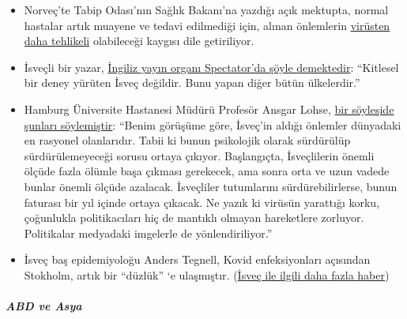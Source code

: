 \begin{itemize}
\tightlist
\item
  Norveç'te Tabip Odası'nın Sağlık Bakanı'na yazdığı açık mektupta,
  normal hastalar artık muayene ve tedavi edilmediği için, alınan
  önlemlerin
  \href{https://www.abcnyheter.no/helse-og-livsstil/helse/2020/04/06/195667780/nesten-halvparten-av-sengene-pa-oslo-universitetssykehus-star-tomme}{virüsten
  daha tehlikeli} olabileceği kaygısı dile getiriliyor.
\item
  İsveçli bir yazar,
  \href{https://www.spectator.co.uk/article/no-lockdown-please-w-re-swedish}{İngiliz
  yayın organı Spectator'da şöyle demektedir}: ``Kitlesel bir deney
  yürüten İsveç değildir. Bunu yapan diğer bütün ülkelerdir.''
\item
  Hamburg Üniversite Hastanesi Müdürü Profesör Ansgar Lohse,
  \href{https://www.abendblatt.de/hamburg/article228880917/uke-professor-shutdown-lohse-deutschland-hamburg-corona-virus-infektion-covid-19-impfstoff-coronavirus-krise-patienten-immunitaet-krankenhaeuser-kontaktverbot-kliniken-infektionsrate.html}{bir
  söyleşide şunları söylemiştir}: ``Benim görüşüme göre, İsveç'in aldığı
  önlemler dünyadaki en rasyonel olanlarıdır. Tabii ki bunun psikolojik
  olarak sürdürülüp sürdürülemeyeceği sorusu ortaya çıkıyor.
  Başlangıçta, İsveçlilerin önemli ölçüde fazla ölümle başa çıkması
  gerekecek, ama sonra orta ve uzun vadede bunlar önemli ölçüde
  azalacak. İsveçliler tutumlarını sürdürebilirlerse, bunun faturası bir
  yıl içinde ortaya çıkacak. Ne yazık ki virüsün yarattığı korku,
  çoğunlukla politikacıları hiç de mantıklı olmayan hareketlere
  zorluyor. Politikalar medyadaki imgelerle de yönlendiriliyor.''
\item
  İsveç baş epidemiyoloğu Anders Tegnell, Kovid enfeksiyonları açısından
  Stokholm, artık bir ``düzlük'' `e ulaşmıştır.
  (\href{https://www.thelocal.se/20200310/timeline-how-the-coronavirus-has-developed-in-sweden}{İsveç
  ile ilgili daha fazla haber})
\end{itemize}

\hypertarget{abd-ve-asya}{%
\subparagraph{\texorpdfstring{\textbf{ABD ve
Asya}}{ABD ve Asya}}\label{abd-ve-asya}}

